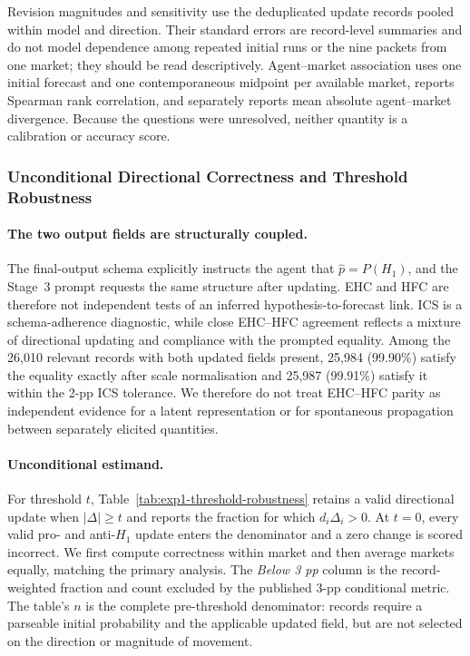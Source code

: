 Revision magnitudes and sensitivity use the deduplicated update records pooled within
model and direction.  Their standard errors are record-level summaries and do not
model dependence among repeated initial runs or the nine packets from one market;
they should be read descriptively.  Agent--market association uses one initial
forecast and one contemporaneous midpoint per available market, reports Spearman rank
correlation, and separately reports mean absolute agent--market divergence.  Because
the questions were unresolved, neither quantity is a calibration or accuracy score.

\subsubsection{Unconditional Directional Correctness and Threshold Robustness}
\label{app:exp1-threshold-robustness}

\paragraph{The two output fields are structurally coupled.}
The final-output schema explicitly instructs the agent that
$\hat p=P(H_1)$, and the Stage~3 prompt requests the same structure after
updating. EHC and HFC are therefore not independent tests of an inferred
hypothesis-to-forecast link. ICS is a schema-adherence diagnostic, while close
EHC--HFC agreement reflects a mixture of directional updating and compliance
with the prompted equality. Among the 26,010 relevant records with both updated
fields present, 25,984 (99.90\%) satisfy the equality exactly after scale
normalisation and 25,987 (99.91\%) satisfy it within the 2-pp ICS tolerance. We
therefore do not treat EHC--HFC parity as independent evidence for a latent
representation or for spontaneous propagation between separately elicited
quantities.

\paragraph{Unconditional estimand.}
For threshold $t$, Table~\ref{tab:exp1-threshold-robustness} retains a valid
directional update when $|\Delta|\geq t$ and reports the fraction for which
$d_i\Delta_i>0$. At $t=0$, every valid pro- and anti-$H_1$ update enters the
denominator and a zero change is scored incorrect. We first compute correctness
within market and then average markets equally, matching the primary analysis.
The \emph{Below 3 pp} column is the record-weighted fraction and count excluded
by the published 3-pp conditional metric. The table's $n$ is the complete
pre-threshold denominator: records require a parseable initial probability and
the applicable updated field, but are not selected on the direction or magnitude
of movement.

